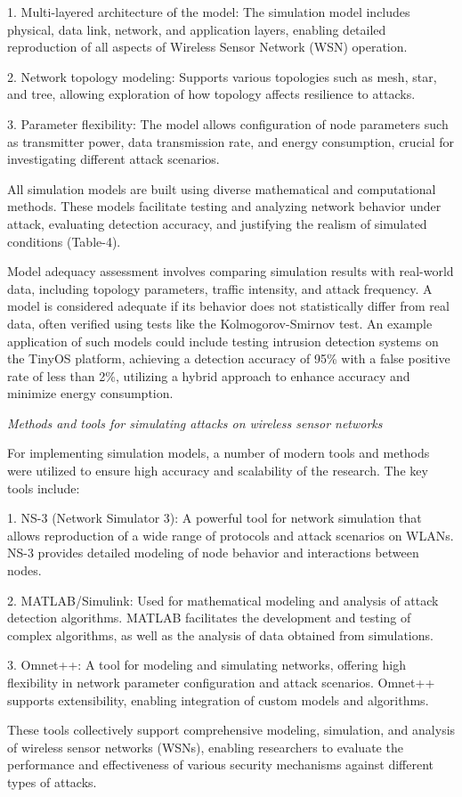 \begin{multicols}{2}
1. Multi-layered architecture of the model: The simulation model
includes physical, data link, network, and application layers, enabling
detailed reproduction of all aspects of Wireless Sensor Network (WSN)
operation.

2. Network topology modeling: Supports various topologies such as mesh,
star, and tree, allowing exploration of how topology affects resilience
to attacks.

3. Parameter flexibility: The model allows configuration of node
parameters such as transmitter power, data transmission rate, and energy
consumption, crucial for investigating different attack scenarios.

All simulation models are built using diverse mathematical and
computational methods. These models facilitate testing and analyzing
network behavior under attack, evaluating detection accuracy, and
justifying the realism of simulated conditions (Table-4).

Model adequacy assessment involves comparing simulation results with
real-world data, including topology parameters, traffic intensity, and
attack frequency. A model is considered adequate if its behavior does
not statistically differ from real data, often verified using tests like
the Kolmogorov-Smirnov test. An example application of such models could
include testing intrusion detection systems on the TinyOS platform,
achieving a detection accuracy of 95\% with a false positive rate of
less than 2\%, utilizing a hybrid approach to enhance accuracy and
minimize energy consumption.

\emph{Methods and tools for simulating attacks on wireless sensor
networks}

For implementing simulation models, a number of modern tools and methods
were utilized to ensure high accuracy and scalability of the research.
The key tools include:

1. NS-3 (Network Simulator 3): A powerful tool for network simulation
that allows reproduction of a wide range of protocols and attack
scenarios on WLANs. NS-3 provides detailed modeling of node behavior and
interactions between nodes.

2. MATLAB/Simulink: Used for mathematical modeling and analysis of
attack detection algorithms. MATLAB facilitates the development and
testing of complex algorithms, as well as the analysis of data obtained
from simulations.

3. Omnet++: A tool for modeling and simulating networks, offering high
flexibility in network parameter configuration and attack scenarios.
Omnet++ supports extensibility, enabling integration of custom models
and algorithms.

These tools collectively support comprehensive modeling, simulation, and
analysis of wireless sensor networks (WSNs), enabling researchers to
evaluate the performance and effectiveness of various security
mechanisms against different types of attacks.

\end{multicols}

